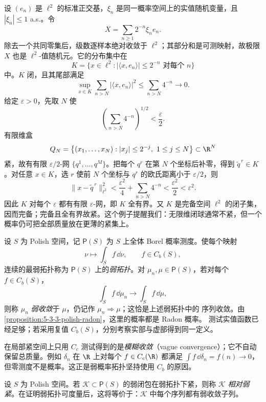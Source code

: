\begin{example}[无限维中的紧质量盒]\label{ex:5-3-3-hilbert-tight}
设 $(e_n)$ 是 $\ell^2$ 的标准正交基，$\xi_n$ 是同一概率空间上的实值随机变量，且
$|\xi_n|\le1$ a.s.。令
\[
 X=\sum_{n\ge1}2^{-n}\xi_ne_n.
\]
除去一个共同零集后，级数逐样本绝对收敛于 $\ell^2$；其部分和是可测映射，故极限
$X$ 也是 $\ell^2$-值随机元。它的分布集中在
\[
 K=\{x\in\ell^2:|\langle x,e_n\rangle|\le2^{-n}\text{ 对每个 }n\}
\]
中。$K$ 闭，且其尾部满足
\[
 \sup_{x\in K}\sum_{n>N}|\langle x,e_n\rangle|^2
 \le\sum_{n>N}4^{-n}\longrightarrow0.
\]
给定 $\varepsilon>0$，先取 $N$ 使
\[
 \left(\sum_{n>N}4^{-n}\right)^{1/2}<\frac{\varepsilon}{2}.
\]
有限维盒
\[
 Q_N=\left\{(x_1,\ldots,x_N):|x_j|\le2^{-j},\ 1\le j\le N\right\}
 \subset\R^N
\]
紧，故有有限 $\varepsilon/2$-网 $\{q^1,\ldots,q^M\}$。把每个 $q^r$ 在第 $N$ 个坐标后补零，得到
$\widetilde q^{\,r}\in K$。对任意 $x\in K$，选 $r$ 使前 $N$ 个坐标与 $q^r$ 的欧氏距离小于
$\varepsilon/2$，则
\[
 \|x-\widetilde q^{\,r}\|_{\ell^2}^2
 <\frac{\varepsilon^2}{4}+\sum_{n>N}4^{-n}
 <\frac{\varepsilon^2}{2}<\varepsilon^2.
\]
因此 $K$ 对每个 $\varepsilon$ 都有有限 $\varepsilon$-网，即 $K$ 全有界。又 $K$ 是完备空间 $\ell^2$ 的闭子集，因而完备；完备且全有界故紧。这个例子提醒我们：无限维闭球通常不紧，但一个概率仍可把全部质量放在更薄的紧集上。
\end{example}

\begin{definition}\label{def:5-3-3-1}
设 $S$ 为 Polish 空间，记 $\mathsf P(S)$ 为 $S$ 上全体 Borel 概率测度。使每个映射
\[
 \nu\longmapsto\int_S f\,\dd\nu,\qquad f\in C_b(S),
\]
连续的最弱拓扑称为 $\mathsf P(S)$ 上的\emph{弱拓扑}。对
$\mu_n,\mu\in\mathsf P(S)$，若对每个 $f\in C_b(S)$，
\[
 \int_S f\,\dd\mu_n\longrightarrow\int_S f\,\dd\mu,
\]
则称 $\mu_n$ \emph{弱收敛}于 $\mu$，仍记作 $\mu_n\Rightarrow\mu$；这恰是上述弱拓扑中的
序列收敛。由
\cref{proposition:5-3-3-polish-radon}，这里的概率都是 Radon 概率。
测试实值函数已经足够；若采用复值 $C_b(S)$，分别考察实部与虚部得到同一定义。
\end{definition}

在局部紧空间上只用 $C_c$ 测试得到的是\emph{模糊收敛}（vague convergence）；它不自动保留总质量。例如
$\delta_n$ 在 $\R$ 上对每个 $f\in C_c(\R)$ 都满足 $\int f\,\dd\delta_n=f(n)\to0$，但零测度不是概率。这正是弱概率拓扑坚持使用 $C_b$ 的原因。

\begin{definition}[相对弱紧]\label{def:5-3-3-2}
设 $S$ 为 Polish 空间。若 $\mathcal K\subset\mathsf P(S)$ 的弱闭包在弱拓扑下紧，则称 $\mathcal K$
\emph{相对弱紧}。在证明弱拓扑可度量后，这将等价于：$\mathcal K$ 中每个序列都有弱收敛子列。
\end{definition}

